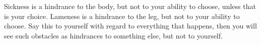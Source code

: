 Sickness is a hindrance to the body, but not to your ability to
choose, unless that is your choice. Lameness is a hindrance to the
leg, but not to your ability to choose. Say this to yourself with
regard to everything that happens, then you will see such obstacles
as hindrances to something else, but not to yourself. 
